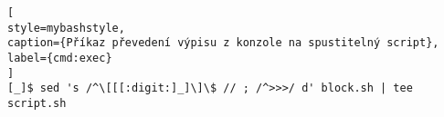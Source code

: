 \begin{lstfloat}
\begin{lstlisting}[
style=mybashstyle,
caption={Příkaz převedení výpisu z konzole na spustitelný script},
label={cmd:exec}
]
[_]$ sed 's /^\[[[:digit:]_]\]\$ // ; /^>>>/ d' block.sh | tee script.sh
\end{lstlisting}
\end{lstfloat}